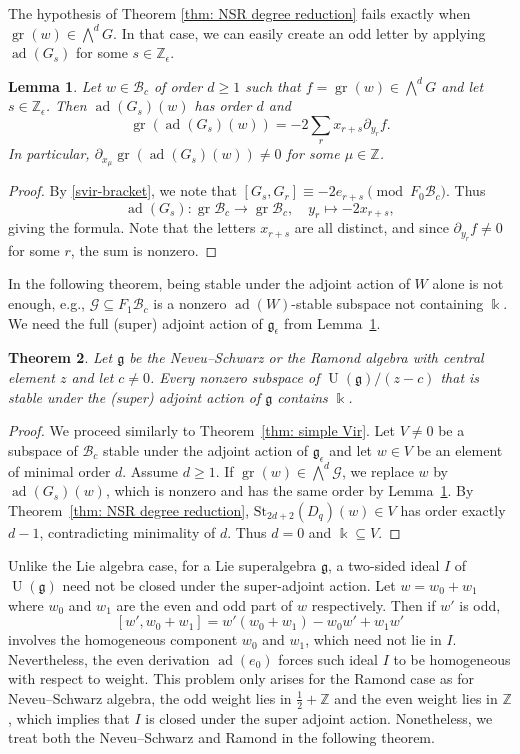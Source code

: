 \documentclass[12pt]{amsart}
\theoremstyle{plain}
\newtheorem{theorem}{Theorem}[section]
\newtheorem{lemma}[theorem]{Lemma}
\theoremstyle{definition}
\numberwithin{equation}{theorem}
\newcommand{\kk}{\Bbbk}
\newcommand{\UU}{\operatorname{U}}
\newcommand{\ad}{\operatorname{ad}}
\newcommand{\gr}{\operatorname{gr}}
\newcommand{\ZZ}{\mathbb{Z}}
\newcommand{\mc}[1]{\mathcal{#1}}
\newcommand{\calB}{\mathcal B}
\newcommand{\g}{\mathfrak{g}}
\newcommand{\geps}{\mathfrak{g}_\epsilon}
\newcommand{\St}{\mathrm{St}}
\begin{document}
 The hypothesis of Theorem \ref{thm: NSR degree reduction} fails exactly when $\gr(w) \in \bigwedge^d G$. In that case, we can easily create an odd letter by applying $\ad(G_s)$ for some $s \in \ZZ_\epsilon$.

 
\begin{lemma}\label{lem: handle all odds}
    Let $w \in \calB_c$ of order $d \geq 1$ such that $f = \gr (w) \in \bigwedge^d G$ and let $s \in \ZZ_\epsilon$. Then $\ad(G_s)(w)$ has order $d$ and 
    \[\gr(\ad(G_s)(w)) = - 2\sum_{r} x_{r+s} \partial_{y_r} f.\]
    In particular, $\partial_{x_\mu} \gr(\ad(G_s)(w)) \neq 0$ for some $\mu \in \ZZ$.
\end{lemma}
\begin{proof}
    By \eqref{svir-bracket}, we note that $[G_s,G_r]\equiv-2e_{r+s}\pmod{F_0\mathcal{B}_c}$. Thus 
    \[\ad(G_s): \gr \calB_c \to \gr \calB_c, \quad y_r \mapsto -2x_{r+s},\]
    giving the formula. Note that the letters $x_{r+s}$ are all distinct, and since $\partial_{y_r} f \neq 0$ for some $r$, the sum is nonzero.
\end{proof}

In the following theorem, being stable under the adjoint action of $W$ alone is not enough, e.g., $\mc{G} \subseteq F_1 \calB_c$ is a nonzero $\ad(W)$-stable subspace not containing $\kk$. We need the full (super) adjoint action of $\geps$ from Lemma~\ref{lem: handle all odds}.
\begin{theorem}\label{thm: NSR simple 1}
    Let $\g$ be the Neveu--Schwarz or the Ramond algebra with central element $z$ and let $c \neq 0$. Every nonzero subspace of $\UU(\g)/(z-c)$ that is stable under the (super) adjoint action of $\g$ contains $\kk$.
\end{theorem}

\begin{proof}
    We proceed similarly to Theorem~\ref{thm: simple Vir}. Let $V \neq 0$ be a subspace of $\calB_c$ stable under the adjoint action of $\geps$ and let $w \in V$ be an element of minimal order $d$. Assume $d \geq 1$. If $\gr(w) \in \bigwedge^d \mathcal{G}$, we replace $w$ by $\ad(G_s)(w)$, which is nonzero and has the same order by Lemma~\ref{lem: handle all odds}. By Theorem~\ref{thm: NSR degree reduction}, $\St_{2d+2}(D_q)(w) \in V$ has order exactly $d-1$, contradicting minimality of $d$. Thus $d=0$ and $\kk \subseteq V$.
\end{proof}

Unlike the Lie algebra case, for a Lie superalgebra $\g$, a two-sided ideal $I$ of $\UU(\g)$ need not be closed under the super-adjoint action. Let $w = w_0 + w_1$ where $w_0$ and $w_1$ are the even and odd part of $w$ respectively. Then if $w'$ is odd, 
\[[w', w_0+w_1] = w'(w_0+w_1) - w_0 w' +w_1w'\]
involves the homogeneous component $w_0$ and $w_1$, which need not lie in $I$. Nevertheless, the even derivation $\ad(e_0)$ forces such ideal $I$ to be homogeneous with respect to weight. This problem only arises for the Ramond case as for Neveu--Schwarz algebra, the odd weight lies in $\frac{1}{2} + \ZZ$ and the even weight lies in $\ZZ$, which implies that $I$ is closed under the super adjoint action. Nonetheless, we treat both the Neveu--Schwarz and Ramond in the following theorem.
\end{document}
